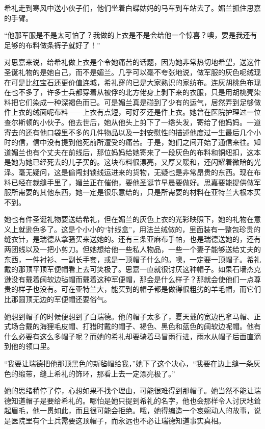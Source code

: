 \par 希礼走到寒风中送小伙子们，他们坐着白蝶姑妈的马车到车站去了。媚兰抓住思嘉的手臂。
\par “他那军服是不是太可怕了？我做的上衣是不是会给他一个惊喜？噢，要是我还有足够的布料做条裤子就好了！”
\par 对思嘉来说，给希礼做上衣是个令她痛苦的话题，因为她非常热切地希望，送这件圣诞礼物的是她自己，而不是媚兰。几乎可以毫不夸张地说，做军服的灰色呢绒现在可是比红宝石还更价值连城，希礼穿的已是大家熟识的家纺布。连灰胡桃色布现在也不多了，许多士兵都穿着从被俘的北方佬身上剥下来的衣服，只是用胡桃壳染料把它们染成一种深褐色而已。可是媚兰真是碰到了少有的运气，居然弄到足够做件上衣的绒面呢布料——上衣有点短，可好歹还是件上衣。她曾在医院护理过一位查尔斯顿的小伙子。他去世后，她从他头上剪下了一绺头发，寄给了他妈妈。一道寄去的还有他口袋里不多的几件物品以及一封安慰性的描述他度过一生最后几个小时的信，信中没有提到他死前所遭受的痛苦。于是，她们之间开始了通信来往。知道媚兰也有个丈夫在前线后，那位妈妈给她寄来了一段灰色的布料和铜纽扣，这本是她为她已经死去的儿子买的。这块布料很漂亮，又厚又暖和，还闪耀着微暗的光泽。毫无疑问，这是偷闯封锁线运进来的货物，无疑也是非常昂贵的东西。现在布料已经在裁缝手里了，媚兰正在催他，要他圣诞节早晨要做好。思嘉要能提供做军服所需要的其他东西，她一定是很乐意给的，只是所需要的材料在亚特兰大根本买不到。
\par 她也有件圣诞礼物要送给希礼，但在媚兰的灰色上衣的光彩映照下，她的礼物在意义上就逊色多了。这是个小小的“针线盒”，用法兰绒做的，里面装有一整包珍贵的缝衣针，是瑞德从拿骚买来送她的。还有三条亚麻布手帕，也是瑞德送她的，还有两团线以及一把小剪刀。但她想给他一些私人物品，一些一个妻子能够送给丈夫的东西，一件衬衫、一副长手套，或是一顶帽子什么的。噢，一定要一顶帽子。希礼戴的那顶平顶军便帽看上去可笑极了。思嘉一直就很讨厌这种帽子。如果石墙杰克逊没有戴着阔软边毡帽而戴着这种军便帽，那会是什么样子？那就会使他们一点尊贵的样子也没有。可在亚特兰大，能买到的帽子都是做得很粗劣的羊毛帽，而它们比那圆顶无边的军便帽还要俗气。
\par 她想到帽子的时候便想到了白瑞德。他的帽子太多了，夏天戴的宽边巴拿马帽、正式场合戴的海狸毛皮帽、打猎时戴的帽子、褐色、黑色和蓝色的阔软边呢帽。他有什么必要有这么多帽子呢？而她的希礼却要骑着马冒雨行进，雨水从帽子后面直滴到他的领口里。
\par “我要让瑞德把他那顶黑色的新毡帽给我，”她下了这个决心，“我要在边上缝一条灰色的缎带，缝上希礼的饰环，那看上去一定漂亮极了。”
\par 她的思绪稍停了停，心想如果不找个理由，可能很难得到那帽子。她当然不能让瑞德知道帽子是要给希礼的。哪怕是她只提到希礼的名字，他也会那样令人讨厌地耸起眉毛，他一贯如此，而且很可能会拒绝。哦，她得编造一个哀婉动人的故事，说是医院里有个士兵需要这顶帽子，而永远也不必让瑞德知道事实真相。
